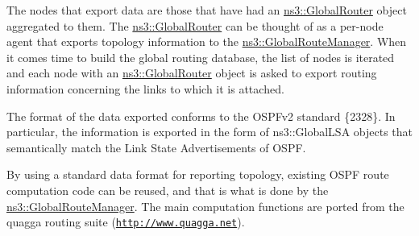 The nodes that export data are those that have had an \hyperlink{classns3_1_1GlobalRouter}{ns3\+::\+Global\+Router} object aggregated to them. The \hyperlink{classns3_1_1GlobalRouter}{ns3\+::\+Global\+Router} can be thought of as a per-\/node agent that exports topology information to the \hyperlink{classns3_1_1GlobalRouteManager}{ns3\+::\+Global\+Route\+Manager}. When it comes time to build the global routing database, the list of nodes is iterated and each node with an \hyperlink{classns3_1_1GlobalRouter}{ns3\+::\+Global\+Router} object is asked to export routing information concerning the links to which it is attached.

The format of the data exported conforms to the O\+S\+P\+Fv2 standard \{2328\}. In particular, the information is exported in the form of ns3\+::\+Global\+L\+SA objects that semantically match the Link State Advertisements of O\+S\+PF.

By using a standard data format for reporting topology, existing O\+S\+PF route computation code can be reused, and that is what is done by the \hyperlink{classns3_1_1GlobalRouteManager}{ns3\+::\+Global\+Route\+Manager}. The main computation functions are ported from the quagga routing suite (\href{http://www.quagga.net}{\tt http\+://www.\+quagga.\+net}). 
